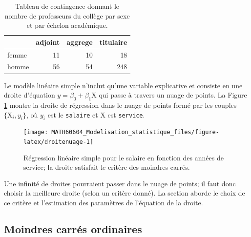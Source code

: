 \documentclass[
  11pt,
  letterpaper,
]{article}
\theoremstyle{definition}
\theoremstyle{definition}
\theoremstyle{definition}
\theoremstyle{definition}
\theoremstyle{remark}
\begin{document}
\begin{table}

\caption{\label{tab:tableaucontingence}Tableau de contingence donnant le nombre de professeurs du collège par sexe et par échelon académique.}
\centering
\begin{tabular}[t]{lrrr}
\toprule
  & adjoint & aggrege & titulaire\\
\midrule
femme & 11 & 10 & 18\\
homme & 56 & 54 & 248\\
\bottomrule
\end{tabular}
\end{table}

Le modèle linéaire simple n'inclut qu'une variable explicative et consiste en une droite d'équation \(y=\beta_0 + \beta_1 \mathrm{X}\) qui passe à travers un nuage de points. La Figure \ref{fig:droitenuage} montre la droite de régression dans le nuage de points formé par les couples \(\{\mathrm{X}_i, y_i\}\), où \(y_i\) est le \texttt{salaire} et \(\mathrm{X}\) est \texttt{service}.

\begin{figure}

{\centering \texttt{[image: MATH60604\_Modelisation\_statistique\_files/figure-latex/droitenuage-1]} 

}

\caption{Régression linéaire simple pour le salaire en fonction des années de service; la droite satisfait le critère des moindres carrés.}\label{fig:droitenuage}
\end{figure}

Une infinité de droites pourraient passer dans le nuage de points; il faut donc choisir la meilleure droite (selon un critère donné). La section aborde le choix de ce critère et l'estimation des paramètres de l'équation de la droite.

\hypertarget{moindres-carruxe9s-ordinaires}{%
\subsection{Moindres carrés ordinaires}\label{moindres-carruxe9s-ordinaires}}
\end{document}

